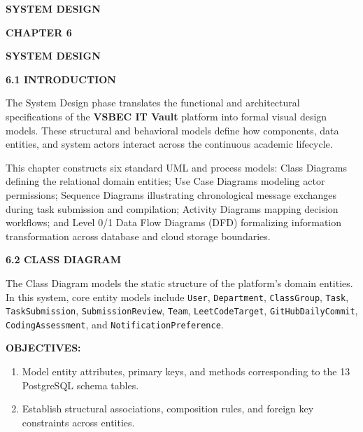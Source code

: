 \vspace*{\fill}
\begin{center}
  {\fontsize{18pt}{24pt}\selectfont\bfseries SYSTEM DESIGN\par}
\end{center}
\vspace*{\fill}
\newpage

\begin{center}
  {\fontsize{16pt}{20pt}\selectfont\bfseries CHAPTER 6\par}
  \vspace{0.3cm}
  {\fontsize{16pt}{20pt}\selectfont\bfseries SYSTEM DESIGN\par}
\end{center}
\vspace{0.4cm}

{\fontsize{14pt}{18pt}\selectfont\bfseries 6.1 INTRODUCTION\par}
\vspace{0.2cm}

{\fontsize{12pt}{18pt}\selectfont
The System Design phase translates the functional and architectural specifications of the \textbf{VSBEC IT Vault} platform into formal visual design models. These structural and behavioral models define how components, data entities, and system actors interact across the continuous academic lifecycle.

This chapter constructs six standard UML and process models: Class Diagrams defining the relational domain entities; Use Case Diagrams modeling actor permissions; Sequence Diagrams illustrating chronological message exchanges during task submission and compilation; Activity Diagrams mapping decision workflows; and Level 0/1 Data Flow Diagrams (DFD) formalizing information transformation across database and cloud storage boundaries.

\vspace{0.3cm}
{\fontsize{14pt}{18pt}\selectfont\bfseries 6.2 CLASS DIAGRAM\par}
\vspace{0.2cm}
The Class Diagram models the static structure of the platform's domain entities. In this system, core entity models include \texttt{User}, \texttt{Department}, \texttt{ClassGroup}, \texttt{Task}, \texttt{TaskSubmission}, \texttt{SubmissionReview}, \texttt{Team}, \texttt{LeetCodeTarget}, \texttt{GitHubDailyCommit}, \texttt{CodingAssessment}, and \texttt{NotificationPreference}.

\vspace{0.2cm}
\noindent\textbf{OBJECTIVES:}
\begin{enumerate}[noitemsep,topsep=2pt,leftmargin=*]
  \item Model entity attributes, primary keys, and methods corresponding to the 13 PostgreSQL schema tables.
  \item Establish structural associations, composition rules, and foreign key constraints across entities.
\end{enumerate}\par}
\newpage


